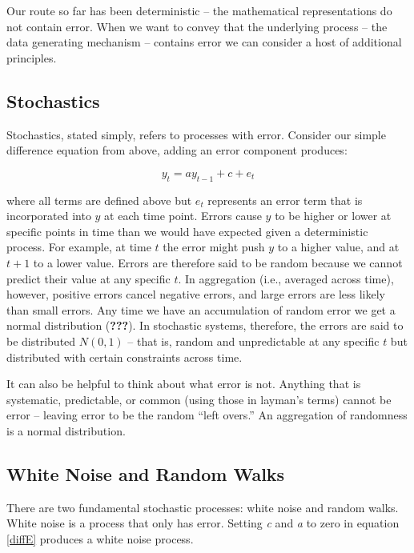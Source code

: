 \documentclass[english,,man]{apa6}
\theoremstyle{definition}
\theoremstyle{definition}
\theoremstyle{definition}
\theoremstyle{remark}
\begin{document}
Our route so far has been deterministic -- the mathematical
representations do not contain error. When we want to convey that the
underlying process -- the data generating mechanism -- contains error we
can consider a host of additional principles.

\hypertarget{stochastics}{%
\subsection{Stochastics}\label{stochastics}}

Stochastics, stated simply, refers to processes with error. Consider our
simple difference equation from above, adding an error component
produces:

\begin{equation}
\label{diffE}
y_{t} = a y_{t-1} + c + e_{t}
\end{equation}

\noindent where all terms are defined above but \(e_{t}\) represents an
error term that is incorporated into \(y\) at each time point. Errors
cause \(y\) to be higher or lower at specific points in time than we
would have expected given a deterministic process. For example, at time
\(t\) the error might push \(y\) to a higher value, and at \(t+1\) to a
lower value. Errors are therefore said to be random because we cannot
predict their value at any specific \(t\). In aggregation (i.e.,
averaged across time), however, positive errors cancel negative errors,
and large errors are less likely than small errors. Any time we have an
accumulation of random error we get a normal distribution
({\textbf{???}}). In stochastic systems, therefore, the errors are said
to be distributed \(N(0, 1)\) -- that is, random and unpredictable at
any specific \(t\) but distributed with certain constraints across time.

It can also be helpful to think about what error is not. Anything that
is systematic, predictable, or common (using those in layman's terms)
cannot be error -- leaving error to be the random \enquote{left overs.}
An aggregation of randomness is a normal distribution.

\hypertarget{white-noise-and-random-walks}{%
\subsection{White Noise and Random
Walks}\label{white-noise-and-random-walks}}

There are two fundamental stochastic processes: white noise and random
walks. White noise is a process that only has error. Setting \emph{c}
and \emph{a} to zero in equation \ref{diffE} produces a white noise
process.
\end{document}
